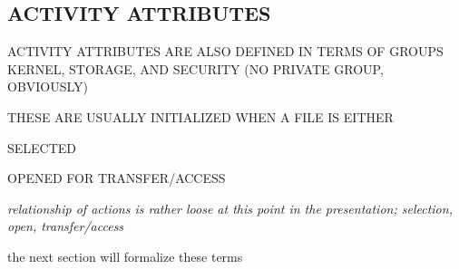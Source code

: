 \begin{bwslide}
\part*	{ACTIVITY ATTRIBUTES}\bf

\begin{nrtc}
\item	ACTIVITY ATTRIBUTES ARE ALSO DEFINED IN TERMS OF GROUPS\\
	KERNEL, STORAGE, AND SECURITY (NO PRIVATE GROUP, OBVIOUSLY)

\item	THESE ARE USUALLY INITIALIZED WHEN A FILE IS EITHER
    \begin{nrtc}
    \item	SELECTED

    \item	OPENED FOR TRANSFER/ACCESS
    \end{nrtc}
\end{nrtc}
\end{bwslide}


\begin{note}\em
relationship of actions is rather loose at this point in the presentation;
selection, open, transfer/access

the next section will formalize these terms
\end{note}


